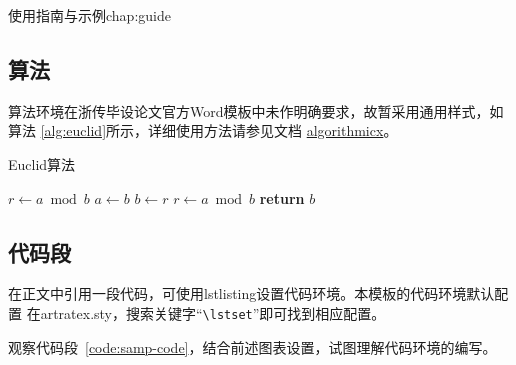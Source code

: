 \begin{cuzchapter}{使用指南与示例}{chap:guide}
    \subsection{算法}\label{sub:algorithms}

    算法环境在浙传毕设论文官方Word模板中未作明确要求，故暂采用通用样式，如算法
    \ref{alg:euclid}所示，详细使用方法请参见文档
    \href{https://ctan.org/pkg/algorithmicx?lang=en}{algorithmicx}。

    \begin{algorithm}[h]
        \small
        \caption{Euclid算法}\label{alg:euclid}
        \begin{algorithmic}[1]
            \State $r\gets a\bmod b$
            \State $a\gets b$
            \State $b\gets r$
            \State $r\gets a\bmod b$
            \EndWhile\label{euclidendwhile}
            \State \textbf{return} $b$
            \EndProcedure
        \end{algorithmic}
    \end{algorithm}

    \subsection{代码段}\label{sub:listings}

    在正文中引用一段代码，可使用lstlisting设置代码环境。本模板的代码环境默认配置
    在artratex.sty，搜索关键字“\verb|\lstset|”即可找到相应配置。

    观察代码段~\ref{code:samp-code}，结合前述图表设置，试图理解代码环境的编写。




\end{cuzchapter}

